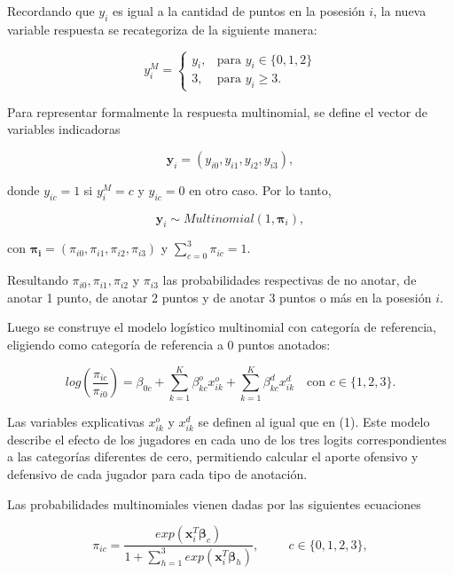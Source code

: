 \documentclass[
  12pt,
]{article}
\begin{document}
Recordando que \(y_i\) es igual a la cantidad de puntos en la posesión
\(i\), la nueva variable respuesta se recategoriza de la siguiente
manera:

\begin{equation}
y^M_i =
\begin{cases}
y_i, & \text{para } y_i \in \{0, 1, 2\} \\
3, & \text{para } y_i \geq 3.
\end{cases}
\end{equation}

Para representar formalmente la respuesta multinomial, se define el
vector de variables indicadoras

\[\boldsymbol{y}_i = (y_{i0}, y_{i1}, y_{i2}, y_{i3}),\]

donde \(y_{ic} = 1\) si \(y^M_i = c\) y \(y_{ic} = 0\) en otro caso. Por
lo tanto,

\[\boldsymbol{y}_i \sim Multinomial(1, \boldsymbol{\pi}_i),\]

con \(\boldsymbol{\pi_i} = (\pi_{i0},\pi_{i1},\pi_{i2},\pi_{i3})\) y
\(\sum_{c=0}^3 \pi_{ic}=1\).

Resultando \(\pi_{i0},\pi_{i1},\pi_{i2}\) y \(\pi_{i3}\) las
probabilidades respectivas de no anotar, de anotar 1 punto, de anotar 2
puntos y de anotar 3 puntos o más en la posesión \(i\).

Luego se construye el modelo logístico multinomial con categoría de
referencia, eligiendo como categoría de referencia a \(0\) puntos
anotados:

\begin{equation}
log(\frac{\pi_{ic}}{\pi_{i0}})=\beta_{0c} + \sum_{k=1}^{K} \beta^o_{kc} x^o_{ik} + \sum_{k=1}^{K} \beta^d_{kc} x^d_{ik}\quad \text{con } c \in \{1,2, 3\}.
\end{equation}

Las variables explicativas \(x^o_{ik}\) y \(x^d_{ik}\) se definen al
igual que en (1). Este modelo describe el efecto de los jugadores en
cada uno de los tres logits correspondientes a las categorías diferentes
de cero, permitiendo calcular el aporte ofensivo y defensivo de cada
jugador para cada tipo de anotación.

Las probabilidades multinomiales vienen dadas por las siguientes
ecuaciones

\begin{equation}
\pi_{ic}=\frac{exp(\boldsymbol{x}_i^T\boldsymbol{\beta}_c)}{1+\sum_{h=1}^3exp(\boldsymbol{x}_i^T\boldsymbol{\beta}_h)}, \hspace{1cm} c \in \{0,1,2, 3\},
\end{equation}
\end{document}
